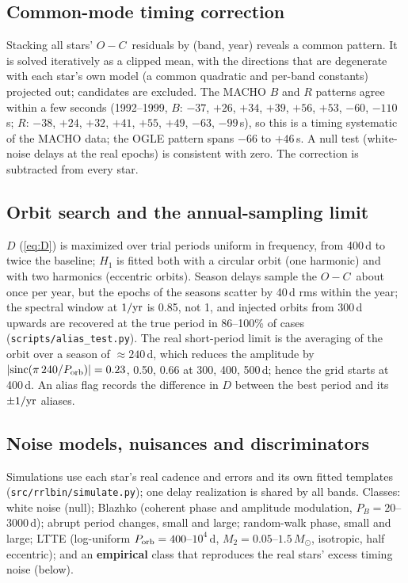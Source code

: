 \documentclass[11pt]{article}
\newcommand{\Msun}{\ensuremath{M_\odot}}
\newcommand{\OC}{\ensuremath{O{-}C}}
\begin{document}
\subsection{Common-mode timing correction}
Stacking all stars' \OC\ residuals by (band, year) reveals a common pattern. It is solved iteratively as a clipped mean,
with the directions that are degenerate with each star's own model (a common quadratic and per-band constants) projected
out; candidates are excluded. The MACHO $B$ and $R$ patterns agree within a few seconds (1992--1999, $B$: $-37$, $+26$, $+34$,
$+39$, $+56$, $+53$, $-60$, $-110$\,s; $R$: $-38$, $+24$, $+32$, $+41$, $+55$, $+49$, $-63$, $-99$\,s), so this is a timing
systematic of the MACHO data; the OGLE pattern spans $-66$ to $+46$\,s. A null test (white-noise delays at the real epochs) is
consistent with zero. The correction is subtracted from every star.

\subsection{Orbit search and the annual-sampling limit}\label{sec:nyquist}
$D$ (\cref{eq:D}) is maximized over trial periods uniform in frequency, from 400\,d to twice the baseline; $H_1$ is fitted both
with a circular orbit (one harmonic) and with two harmonics (eccentric orbits). Season delays sample the \OC\ about once per
year, but the epochs of the seasons scatter by 40\,d rms within the year; the spectral window at $1/{\rm yr}$ is 0.85, not 1, and
injected orbits from 300\,d upwards are recovered at the true period in 86--100\% of cases (\texttt{scripts/alias\_test.py}).
The real short-period limit is the averaging of the orbit over a season of $\approx240$\,d, which reduces the amplitude by
$|\mathrm{sinc}(\pi\,240/P_{\rm orb})|=0.23$, 0.50, 0.66 at 300, 400, 500\,d; hence the grid starts at 400\,d. An alias flag
records the difference in $D$ between the best period and its $\pm1/{\rm yr}$ aliases.

\subsection{Noise models, nuisances and discriminators}\label{sec:nuis}
Simulations use each star's real cadence and errors and its own fitted templates (\texttt{src/rrlbin/simulate.py}); one
delay realization is shared by all bands. Classes: white noise (null); Blazhko (coherent phase and amplitude modulation,
$P_B=20$--3000\,d); abrupt period changes, small and large; random-walk phase, small and large; LTTE (log-uniform
$P_{\rm orb}=400$--$10^4$\,d, $M_2=0.05$--$1.5\,\Msun$, isotropic, half eccentric); and an \textbf{empirical} class that
reproduces the real stars' excess timing noise (below).
\end{document}
